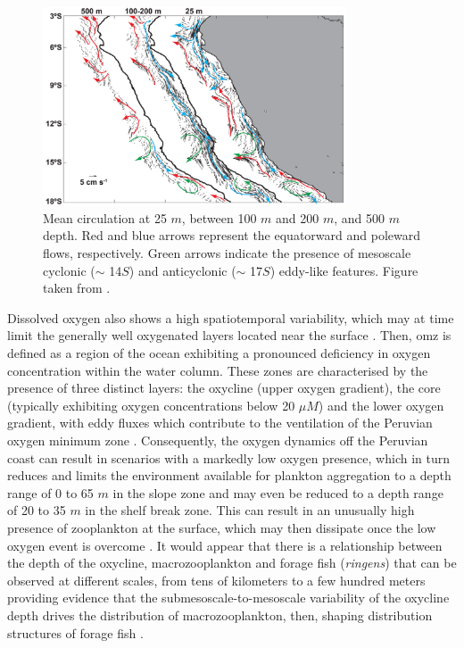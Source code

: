 \begin{figure}[ht]
	\includegraphics[width=0.8\textwidth]{figures/Chap1MeanCirculationNHCS.png}
	\centering
	\caption{Mean circulation at 25 $m$, between 100 $m$ and 200 $m$, and 500 $m$ depth. Red and blue arrows represent the equatorward and poleward flows, respectively. Green arrows indicate the presence of mesoscale cyclonic ($\sim$ 14\textdegree $S$) and anticyclonic ($\sim$ 17\textdegree $S$) eddy-like features. Figure taken from \cite{ChaiDomi2013}.}
	\label{Chap1MeanCirculationNHCS}
\end{figure}

Dissolved oxygen also shows a high spatiotemporal variability, which may at time limit the generally well oxygenated layers located near the surface \citep{EspiEche2017,EspiEche2019}. Then, \acrlong{omz} is defined as a region of the ocean exhibiting a pronounced deficiency in oxygen concentration within the water column. These zones are characterised by the presence of three distinct layers: the oxycline (upper oxygen gradient), the core (typically exhibiting oxygen concentrations below 20 $\mu M$) and the lower oxygen gradient, with eddy fluxes which contribute to the ventilation of the Peruvian oxygen minimum zone \citep{BettLope2015}. Consequently, the oxygen dynamics off the Peruvian coast can result in scenarios with a markedly low oxygen presence, which in turn reduces and limits the environment available for plankton aggregation to a depth range of 0 to 65 $m$ in the slope zone and may even be reduced to a depth range of 20 to 35 $m$ in the shelf break zone. This can result in an unusually high presence of zooplankton at the surface, which may then dissipate once the low oxygen event is overcome \citep{Judk1980}. It would appear that there is a relationship between the depth of the oxycline, macrozooplankton and forage fish (\textit{\gls{ringens}}) that can be observed at different scales, from tens of kilometers to a few hundred meters providing evidence that the submesoscale-to-mesoscale variability of the oxycline depth drives the distribution of macrozooplankton, then, shaping distribution structures of forage fish \citep{GradFabl2012,GradBert2016}.\\

